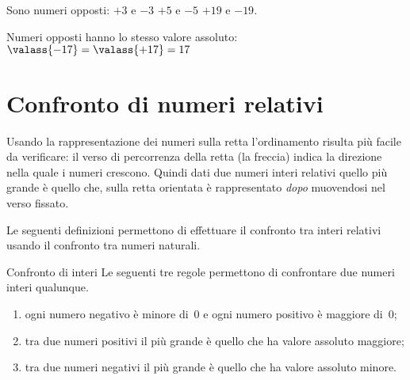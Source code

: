 \begin{esempio}{}{}
Sono numeri opposti: \qquad \(+3\) e \(-3\) \quad \(+5\) e \(-5\) 
\quad \(+19\) e \(-19\).
\end{esempio}

Numeri opposti hanno lo stesso valore assoluto: \qquad 
\(\valass{-17} = \valass{+17} = 17\)

\section{Confronto di numeri relativi}
\label{sec:int_confronto}

Usando la rappresentazione dei numeri sulla retta l'ordinamento risulta più 
facile da verificare:
il verso di percorrenza della retta (la freccia) indica la direzione nella 
quale i numeri crescono.
Quindi dati due numeri interi relativi quello più grande è quello che, sulla 
retta orientata è rappresentato \emph{dopo} muovendosi nel verso fissato.

Le seguenti definizioni permettono di effettuare il confronto tra interi 
relativi usando il confronto tra numeri naturali.

\begin{definizione}{Confronto di interi}{}
Le seguenti tre regole permettono di confrontare due numeri interi qualunque.
\begin{enumerate} [noitemsep] %
\item ogni numero negativo è minore di~0 e ogni numero 
positivo è maggiore di~0;
\item tra due numeri positivi il più grande è quello che ha valore 
assoluto maggiore;
\item tra due numeri negativi il più grande è quello che ha valore 
assoluto minore.
\end{enumerate}

\end{definizione}



